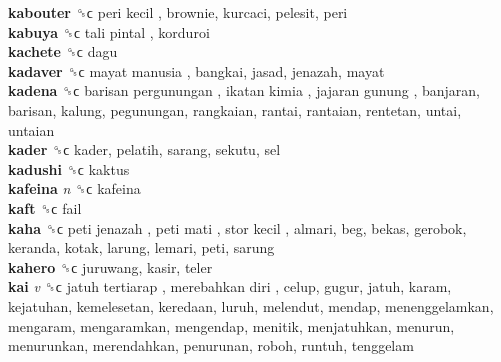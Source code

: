 \textbf{kabouter} ␝ϲ   peri kecil , brownie, kurcaci, pelesit, peri  \\
\textbf{kabuya} ␝ϲ   tali pintal , korduroi  \\
\textbf{kachete} ␝ϲ  dagu  \\
\textbf{kadaver} ␝ϲ   mayat manusia , bangkai, jasad, jenazah, mayat  \\
\textbf{kadena} ␝ϲ   barisan pergunungan ,  ikatan kimia ,  jajaran gunung , banjaran, barisan, kalung, pegunungan, rangkaian, rantai, rantaian, rentetan, untai, untaian  \\
\textbf{kader} ␝ϲ  kader, pelatih, sarang, sekutu, sel  \\
\textbf{kadushi} ␝ϲ  kaktus  \\
\textbf{kafeina} \emph{n}  ␝ϲ  kafeina  \\
\textbf{kaft} ␝ϲ  fail  \\
\textbf{kaha} ␝ϲ   peti jenazah ,  peti mati ,  stor kecil , almari, beg, bekas, gerobok, keranda, kotak, larung, lemari, peti, sarung  \\
\textbf{kahero} ␝ϲ  juruwang, kasir, teler  \\
\textbf{kai} \emph{v}  ␝ϲ   jatuh tertiarap ,  merebahkan diri , celup, gugur, jatuh, karam, kejatuhan, kemelesetan, keredaan, luruh, melendut, mendap, menenggelamkan, mengaram, mengaramkan, mengendap, menitik, menjatuhkan, menurun, menurunkan, merendahkan, penurunan, roboh, runtuh, tenggelam  \\
